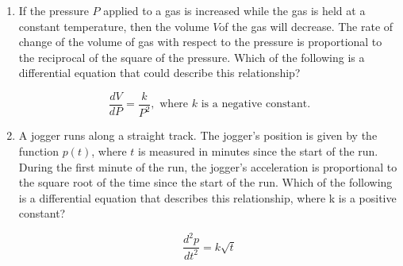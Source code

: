 \documentclass[12pt]{article}
\begin{document}
\begin{enumerate}
\item If the pressure $P$ applied to a gas is increased while the gas is held at a constant temperature, then the volume $V $of the gas will decrease. The rate of change of the volume of gas with respect to the pressure is proportional to the reciprocal of the square of the pressure. Which of the following is a differential equation that could describe this relationship?

$$\boxed{\frac{dV}{dP} =\frac{k}{P^2}, \text{ where } k \text{ is a negative constant.}}$$

\item A jogger runs along a straight track. The jogger’s position is given by the function $p(t)$, where $t$ is measured in minutes since the start of the run. During the first minute of the run, the jogger’s acceleration is proportional to the square root of the time since the start of the run. Which of the following is a differential equation that describes this relationship, where k is a positive constant?

$$\boxed{\frac{d^2p}{dt^2}=k \sqrt{t}}$$

\end{enumerate}
\end{document}
